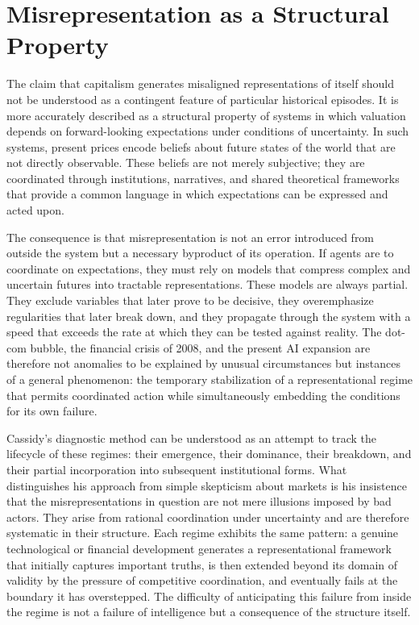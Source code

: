 \documentclass[11pt, a4paper]{article}
\theoremstyle{plain}
\theoremstyle{definition}
\begin{document}
\section{Misrepresentation as a Structural Property}

The claim that capitalism generates misaligned representations of itself should
not be understood as a contingent feature of particular historical episodes.
It is more accurately described as a structural property of systems in which
valuation depends on forward-looking expectations under conditions of
uncertainty. In such systems, present prices encode beliefs about future states
of the world that are not directly observable. These beliefs are not merely
subjective; they are coordinated through institutions, narratives, and shared
theoretical frameworks that provide a common language in which expectations can
be expressed and acted upon.

The consequence is that misrepresentation is not an error introduced from
outside the system but a necessary byproduct of its operation. If agents are
to coordinate on expectations, they must rely on models that compress complex
and uncertain futures into tractable representations. These models are always
partial. They exclude variables that later prove to be decisive, they
overemphasize regularities that later break down, and they propagate through
the system with a speed that exceeds the rate at which they can be tested
against reality. The dot-com bubble, the financial crisis of 2008, and the
present AI expansion are therefore not anomalies to be explained by unusual
circumstances but instances of a general phenomenon: the temporary
stabilization of a representational regime that permits coordinated action
while simultaneously embedding the conditions for its own failure.

Cassidy's diagnostic method can be understood as an attempt to track the
lifecycle of these regimes: their emergence, their dominance, their breakdown,
and their partial incorporation into subsequent institutional forms. What
distinguishes his approach from simple skepticism about markets is his
insistence that the misrepresentations in question are not mere illusions
imposed by bad actors. They arise from rational coordination under uncertainty
and are therefore systematic in their structure. Each regime exhibits the same
pattern: a genuine technological or financial development generates a
representational framework that initially captures important truths, is then
extended beyond its domain of validity by the pressure of competitive
coordination, and eventually fails at the boundary it has overstepped.
The difficulty of anticipating this failure from inside the regime is not a
failure of intelligence but a consequence of the structure itself.
\end{document}
